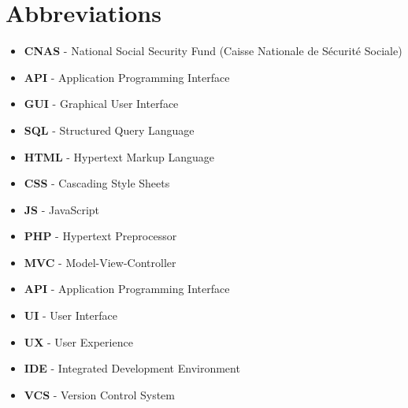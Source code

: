 \documentclass[12pt]{report}
\begin{document}
\tableofcontents
\listoffigures
\listoftables


\chapter*{Abbreviations}

\begin{itemize}
    \item \textbf{CNAS} - National Social Security Fund (Caisse Nationale de Sécurité Sociale)
    \item \textbf{API} - Application Programming Interface
    \item \textbf{GUI} - Graphical User Interface
    \item \textbf{SQL} - Structured Query Language
    \item \textbf{HTML} - Hypertext Markup Language
    \item \textbf{CSS} - Cascading Style Sheets
    \item \textbf{JS} - JavaScript
    \item \textbf{PHP} - Hypertext Preprocessor
    \item \textbf{MVC} - Model-View-Controller
    \item \textbf{API} - Application Programming Interface
    \item \textbf{UI} - User Interface
    \item \textbf{UX} - User Experience
    \item \textbf{IDE} - Integrated Development Environment
    \item \textbf{VCS} - Version Control System
\end{itemize}










 
\end{document}
